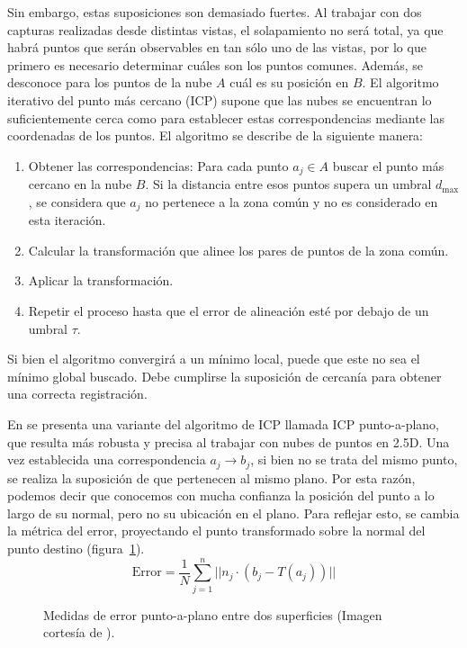 Sin embargo, estas suposiciones son demasiado fuertes.
Al trabajar con dos capturas realizadas desde distintas vistas, el solapamiento no será total,
ya que habrá puntos que serán observables en tan sólo uno de las vistas,
por lo que primero es necesario determinar cuáles son los puntos comunes.
Además, se desconoce para los puntos de la nube $A$ cuál es su posición en $B$.
El algoritmo iterativo del punto más cercano (ICP) supone que las nubes se encuentran
lo suficientemente cerca como para establecer estas correspondencias mediante las coordenadas de los puntos.
El algoritmo se describe de la siguiente manera:
\begin{enumerate}
	\item Obtener las correspondencias:
		Para cada punto $a_j \in A$ buscar el punto más cercano en la nube $B$.
		Si la distancia entre esos puntos supera un umbral $d_{\text{max}}$,
		se considera que $a_j$ no pertenece a la zona común y no es considerado en esta iteración.
	\item Calcular la transformación que alinee los pares de puntos de la zona común.
	\item Aplicar la transformación.
	\item Repetir el proceso hasta que el error de alineación esté por debajo de un umbral $\tau$.
\end{enumerate}%
Si bien el algoritmo convergirá a un mínimo local, puede que este no sea el mínimo global buscado.
Debe cumplirse la suposición de cercanía para obtener una correcta registración.\cite{regBesl92}

En \cite{chen-medoni} se presenta una variante del algoritmo de ICP llamada ICP punto-a-plano,
que resulta más robusta y precisa al trabajar con nubes de puntos en 2.5D. 
Una vez establecida una correspondencia $a_j \to b_j$, si bien no se trata del mismo punto,
se realiza la suposición de que pertenecen al mismo plano.
Por esta razón, podemos decir que conocemos con mucha confianza la posición del punto
a lo largo de su normal, pero no su ubicación en el plano.
Para reflejar esto, se cambia la métrica del error, proyectando el punto transformado sobre la normal
del punto destino (figura~\ref{fig:point_to_plane}).
\[
	\text{Error} = \frac{1}{N} \sum_{j=1}^n || n_j \cdot \left( b_j - T \left(a_j\right) \right) ||
\]

\begin{figure}
	\centering
	
	\caption{\label{fig:point_to_plane}Medidas de error punto-a-plano entre dos superficies
	(Imagen cortesía de \cite{icp_point_to_plane}).}
\end{figure}


